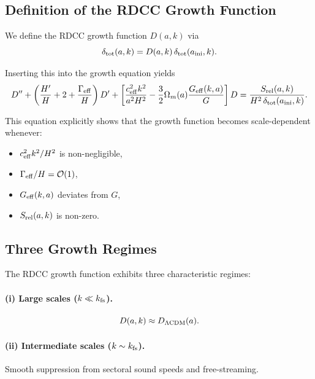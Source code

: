 \documentclass[11pt,a4paper]{article}
\begin{document}
\subsection{Definition of the RDCC Growth Function}

We define the RDCC growth function $D(a,k)$ via
\begin{equation}
\delta_{\rm tot}(a,k)
= D(a,k)\,\delta_{\rm tot}(a_{\rm ini},k).
\end{equation}

Inserting this into the growth equation yields
\begin{equation}
D'' + \left( \frac{H'}{H} + 2 + \frac{\Gamma_{\rm eff}}{H} \right) D'
+ \left[
\frac{c_{\rm eff}^2 k^2}{a^2 H^2}
- \frac{3}{2}\Omega_m(a)\frac{G_{\rm eff}(k,a)}{G}
\right] D
= \frac{S_{\rm rel}(a,k)}{H^2\,\delta_{\rm tot}(a_{\rm ini},k)}.
\end{equation}

This equation explicitly shows that the growth function becomes scale-dependent whenever:
\begin{itemize}
\item $c_{\rm eff}^2 k^2 / H^2$ is non-negligible,
\item $\Gamma_{\rm eff}/H = \mathcal{O}(1)$,
\item $G_{\rm eff}(k,a)$ deviates from $G$,
\item $S_{\rm rel}(a,k)$ is non-zero.
\end{itemize}

\subsection{Three Growth Regimes}

The RDCC growth function exhibits three characteristic regimes:

\paragraph{(i) Large scales ($k \ll k_{\rm fs}$).}
\begin{equation}
D(a,k) \approx D_{\Lambda{\rm CDM}}(a).
\end{equation}

\paragraph{(ii) Intermediate scales ($k \sim k_{\rm fs}$).}
Smooth suppression from sectoral sound speeds and free-streaming.
\end{document}

